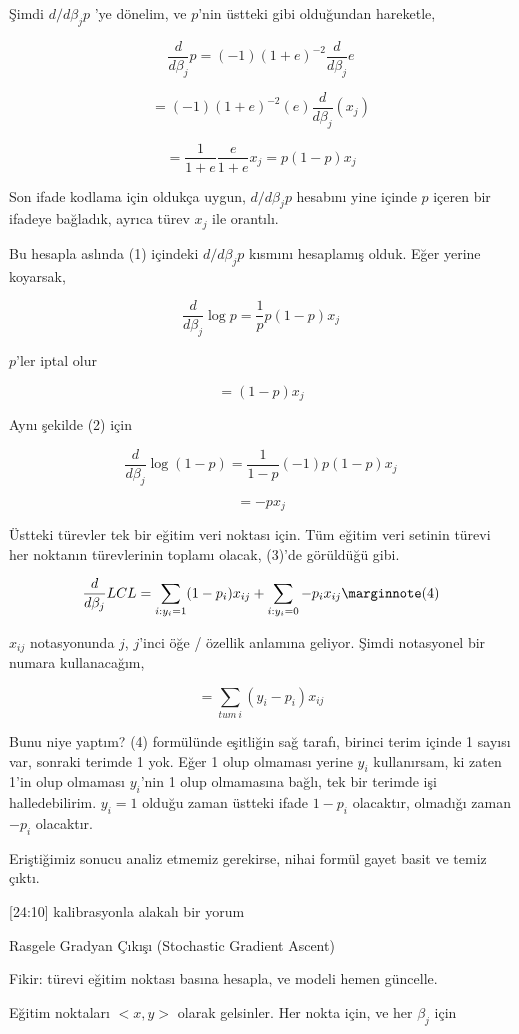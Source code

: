 \documentclass[12pt,fleqn]{article}\usepackage{../../common}
\begin{document}
Şimdi $d / d \beta_j p$ 'ye dönelim, ve $p$'nin üstteki gibi olduğundan
hareketle,

$$
\frac{ d}{d \beta_j}p = (-1)(1+e)^{-2} \frac{ d}{d \beta_j}e
$$

$$
= (-1)(1+e)^{-2} (e) \frac{ d}{d \beta_j}(x_j)
$$

$$
= \frac{ 1}{1+e} \frac{ e}{1+e}x_j = p(1-p)x_j
$$

Son ifade kodlama için oldukça uygun, $d/d \beta_j p$ hesabını yine içinde
$p$ içeren bir ifadeye bağladık, ayrıca türev $x_j$ ile orantılı. 

Bu hesapla aslında (1) içindeki $d/d \beta_j p$ kısmını hesaplamış
olduk. Eğer yerine koyarsak, 

$$ 
\frac{d}{d \beta_j}\log p = \frac{1}{p}p(1-p)x_j 
$$

$p$'ler iptal olur

$$ 
= (1-p)x_j 
$$

Aynı şekilde (2) için 

$$ 
\frac{d}{d \beta_j}\log (1-p) = \frac{1}{1-p}(-1) p(1-p)x_j 
$$

$$ 
 =  -px_j 
$$

Üstteki türevler tek bir eğitim veri noktası için. Tüm eğitim veri setinin
türevi her noktanın türevlerinin toplamı olacak, (3)'de görüldüğü gibi.

$$ \frac{d}{d \beta_j} LCL = 
\sum_{i: y_i = 1} (1-p_i)x_{ij} + 
\sum_{i: y_i = 0} -p_i x_{ij}  
\mlabel{4}
$$

$x_{ij}$ notasyonunda $j$, $j$'inci öğe / özellik anlamına geliyor. Şimdi 
notasyonel bir numara kullanacağım, 

$$ = \sum_{tum \ i} (y_i - p_i)x_{ij} $$

Bunu niye yaptım? (4) formülünde eşitliğin sağ tarafı, birinci terim içinde
1 sayısı var, sonraki terimde 1 yok. Eğer 1 olup olmaması yerine $y_i$
kullanırsam, ki zaten 1'in olup olmaması $y_i$'nin 1 olup olmamasına bağlı,
tek bir terimde işi halledebilirim. $y_i=1$ olduğu zaman üstteki ifade
$1-p_i$ olacaktır, olmadığı zaman $-p_i$ olacaktır. 

Eriştiğimiz sonucu analiz etmemiz gerekirse, nihai formül gayet basit ve
temiz çıktı. 

[24:10] kalibrasyonla alakalı bir yorum

Rasgele Gradyan Çıkışı (Stochastic Gradient Ascent)

Fikir: türevi eğitim noktası basına hesapla, ve modeli hemen güncelle. 

Eğitim noktaları $< x,y >$ olarak gelsinler. Her nokta için, ve her $\beta_j$
için
\end{document}
